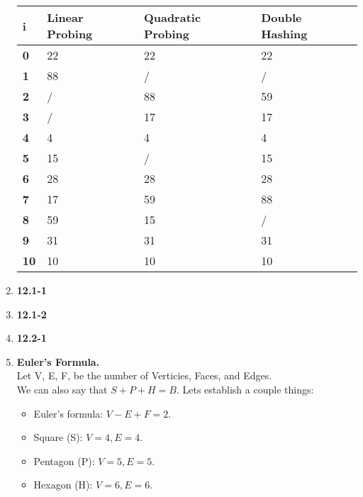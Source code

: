 \documentclass{article}
\begin{document}
\begin{enumerate}
    \begin{table}[H]
      \begin{tabular}{|l|l|l|l|}
      \hline
      \textbf{i}  & \textbf{Linear Probing} & \textbf{Quadratic Probing} & \textbf{Double Hashing} \\ \hline
      \textbf{0}  & 22                      & 22                         & 22                      \\ \hline
      \textbf{1}  & 88                      & /                          & /                       \\ \hline
      \textbf{2}  & /                       & 88                         & 59                      \\ \hline
      \textbf{3}  & /                       & 17                         & 17                      \\ \hline
      \textbf{4}  & 4                       & 4                          & 4                       \\ \hline
      \textbf{5}  & 15                      & /                          & 15                      \\ \hline
      \textbf{6}  & 28                      & 28                         & 28                      \\ \hline
      \textbf{7}  & 17                      & 59                         & 88                      \\ \hline
      \textbf{8}  & 59                      & 15                         & /                       \\ \hline
      \textbf{9}  & 31                      & 31                         & 31                      \\ \hline
      \textbf{10} & 10                      & 10                         & 10                      \\ \hline
      \end{tabular}
    \end{table}

    \item \textbf{12.1-1}
    \item \textbf{12.1-2}
    \item \textbf{12.2-1}
    \item \textbf{Euler's Formula.} \\
    
    Let V, E, F, be the number of Verticies, Faces, and Edges. \\
    We can also say that $S + P + H = B$.
    Lets establish a couple things: 
    \begin{itemize}
        \item Euler's formula: $V - E + F = 2$.
        \item Square (S): $V = 4, E = 4$.
        \item Pentagon (P): $V = 5, E = 5$.
        \item Hexagon (H): $V = 6, E = 6$.
    \end{itemize}


\end{enumerate}
\end{document}
